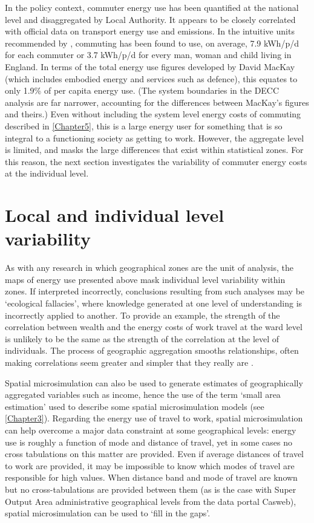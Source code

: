 \documentclass[a4paper, 11pt, twoside]{Thesis}
\begin{document}
In the policy context, commuter energy use has been
quantified at the national level and disaggregated by Local Authority.
It appears to be closely correlated with official data on transport energy
use and emissions. In the intuitive units recommended by \citet{MacKay2009},
commuting has been found to use, on average, 7.9 kWh/p/d for each commuter or
3.7 kWh/p/d for every man, woman and child living in England. In terms of
the total energy use figures developed by David MacKay (which includes
embodied energy and services such as defence), this equates to
only 1.9\% of per capita energy use. (The system boundaries in the
DECC analysis are far narrower, accounting for the differences between
MacKay's figures and theirs.) Even without including the system level
energy costs of commuting described in \cref{Chapter5}, this is a large
energy user for something that is so integral to a functioning society as
getting to work. However, the aggregate level is limited, and masks the
large differences that exist within statistical zones.
For this reason, the next section investigates the variability of commuter
energy costs at the individual level.


\section{Local and individual level variability} \label{sindvar}

As with any research in which geographical zones are the unit of analysis,
the maps of energy use presented above mask individual level variability within
zones. If interpreted incorrectly, conclusions resulting from such analyses
may be `ecological fallacies', where knowledge generated
at one level of understanding is incorrectly applied to another.
To provide an example, the strength of the correlation between wealth and the energy
costs of work travel at the ward level is unlikely to be the same as the
strength of the correlation at the level of individuals. The process of
geographic aggregation smooths relationships, often making correlations seem
greater and simpler that they really are \citep{Openshaw1983}. 

Spatial microsimulation can also be used to generate estimates of
geographically aggregated variables such as income, hence the use of the term
`small area estimation' used to describe some spatial microsimulation models
(see \cref{Chapter3}). Regarding the energy use of travel to work, spatial
microsimulation can help overcome a major data constraint at some geographical
levels: energy use is roughly a function of mode and distance of travel, yet
in some cases no cross tabulations on this matter are provided.
Even if average distances of travel to work are provided, it may be
impossible to know which modes of travel are responsible for high values.
When distance band and mode of travel are known but no cross-tabulations
are provided between them (as is the case with Super Output Area administrative
geographical levels from the data portal Casweb),
spatial microsimulation can be used to `fill in the gaps'.
\end{document}
